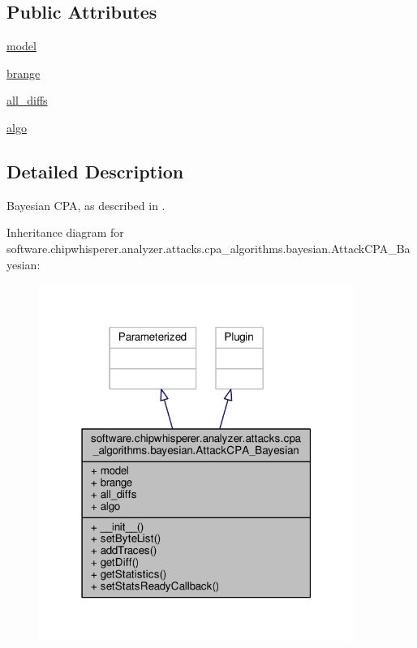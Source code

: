 \subsection*{Public Attributes}
\begin{DoxyCompactItemize}
\item 
\hyperlink{classsoftware_1_1chipwhisperer_1_1analyzer_1_1attacks_1_1cpa__algorithms_1_1bayesian_1_1AttackCPA__Bayesian_af022f3198f2e10d86b24c3be60d47c17}{model}
\item 
\hyperlink{classsoftware_1_1chipwhisperer_1_1analyzer_1_1attacks_1_1cpa__algorithms_1_1bayesian_1_1AttackCPA__Bayesian_af7bc6ec8a96232a156c4037e096d0b4f}{brange}
\item 
\hyperlink{classsoftware_1_1chipwhisperer_1_1analyzer_1_1attacks_1_1cpa__algorithms_1_1bayesian_1_1AttackCPA__Bayesian_a5532b7afae0ffa6daa7b093765505da9}{all\+\_\+diffs}
\item 
\hyperlink{classsoftware_1_1chipwhisperer_1_1analyzer_1_1attacks_1_1cpa__algorithms_1_1bayesian_1_1AttackCPA__Bayesian_a19c03b6e5b6685f20f049d36b0b724ff}{algo}
\end{DoxyCompactItemize}


\subsection{Detailed Description}
\begin{DoxyVerb}Bayesian CPA, as described in .
\end{DoxyVerb}
 

Inheritance diagram for software.\+chipwhisperer.\+analyzer.\+attacks.\+cpa\+\_\+algorithms.\+bayesian.\+Attack\+C\+P\+A\+\_\+\+Bayesian\+:\nopagebreak
\begin{figure}[H]
\begin{center}
\leavevmode
\includegraphics[width=291pt]{d4/dfb/classsoftware_1_1chipwhisperer_1_1analyzer_1_1attacks_1_1cpa__algorithms_1_1bayesian_1_1AttackCPA__Bayesian__inherit__graph}
\end{center}
\end{figure}


